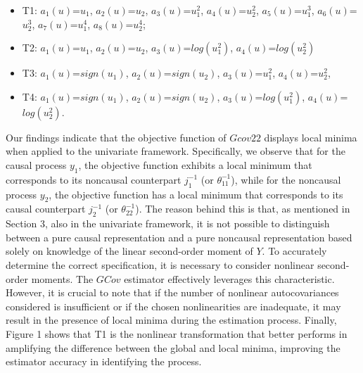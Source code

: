 \documentclass[<1p>]{elsarticle} %
\begin{document}
\begin{itemize}
\item T1: $a_{1}(u)$=$u_{1}$, $a_{2}(u)$=$u_{2}$,
	$a_{3}(u)$=$u_{1}^{2}$, $a_{4}(u)$=$u_{2}^{2}$,
	$a_{5}(u)$=$u_{1}^{3}$, $a_{6}(u)$=$u_{2}^{3}$,
	$a_{7}(u)$=$u_{1}^{4}$, $a_{8}(u)$=$u_{2}^{4}$;
 
 \item T2: $a_{1}(u)$=$u_{1}$, $a_{2}(u)$=$u_{2}$,
$a_{3}(u)$=$log(u_{1}^{2})$, $a_{4}(u)$=$log(u_{2}^{2})$

 \item T3: $a_{1}(u)$=$sign(u_{1})$, $a_{2}(u)$=$sign(u_{2})$,
$a_{3}(u)$=$u_{1}^{2}$, $a_{4}(u)$=$u_{2}^{2}$,
 
 \item T4: $a_{1}(u)$=$sign(u_{1})$, $a_{2}(u)$=$sign(u_{2})$,
	$a_{3}(u)$=$log(u_{1}^{2})$, $a_{4}(u)$=$log(u_{2}^{2})$.
\end{itemize}
Our findings indicate that the objective function of $Gcov22$ displays local minima when applied to the univariate framework. Specifically, we observe that for the causal process $y_1$, the objective function exhibits a local minimum that corresponds to its noncausal counterpart $j_{1}^{-1}$ (or $\theta_{11}^{-1}$), while for the noncausal process $y_2$, the objective function has a local minimum that corresponds to its causal counterpart $j_{2}^{-1}$ (or $\theta_{22}^{-1}$). The reason behind this is that, as mentioned in Section 3, also in the univariate framework, it is not possible to distinguish between a pure causal representation and a pure noncausal representation based solely on knowledge of the linear second-order moment of $Y$. To accurately determine the correct specification, it is necessary to consider nonlinear second-order moments. The $GCov$ estimator effectively leverages this characteristic. However, it is crucial to note that if the number of nonlinear autocovariances considered is insufficient or if the chosen nonlinearities are inadequate, it may result in the presence of local minima during the estimation process. Finally, Figure 1 shows that T1 is the nonlinear transformation that better performs in amplifying the difference between the global and local minima, improving the estimator accuracy in identifying the process.\\
\end{document}

